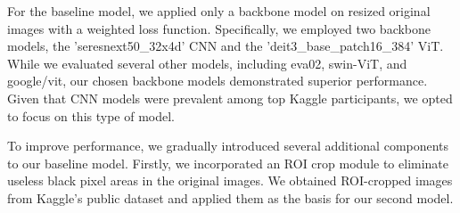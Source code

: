 
For the baseline model, we applied only a backbone model on resized original images with a weighted loss function. Specifically, we employed two backbone models, the 'seresnext50\_32x4d' CNN and the 'deit3\_base\_patch16\_384' ViT. While we evaluated several other models, including eva02, swin-ViT, and google/vit, our chosen backbone models demonstrated superior performance. Given that CNN models were prevalent among top Kaggle participants, we opted to focus on this type of model. 

To improve performance, we gradually introduced several additional components to our baseline model. Firstly, we incorporated an ROI crop module to eliminate useless black pixel areas in the original images. We obtained ROI-cropped images from Kaggle's public dataset and applied them as the basis for our second model. 


